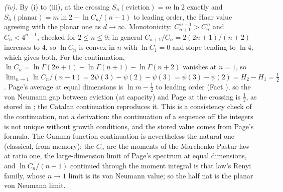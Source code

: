 \emph{(iv).} By (i) to (iii), at the crossing $S_{n}(\text{eviction}) = m\ln 2$ exactly and $S_{n}(\text{planar}) = m\ln 2 - \ln C_{n}/(n-1)$ to leading order, the Haar value agreeing with the planar one as $d \to \infty$. Monotonicity: $C_{n+1}^{\,n-1} > C_{n}^{\,n}$ and $C_{n} < 4^{n-1}$, checked for $2 \leq n \leq 9$; in general $C_{n+1}/C_{n} = 2(2n+1)/(n+2)$ increases to $4$, so $\ln C_n$ is convex in $n$ with $\ln C_{1} = 0$ and slope tending to $\ln 4$, which gives both. For the continuation, $\ln C_{n} = \ln\Gamma(2n+1) - \ln\Gamma(n+1) - \ln\Gamma(n+2)$ vanishes at $n = 1$, so $\lim_{n\to 1}\ln C_{n}/(n-1) = 2\psi(3) - \psi(2) - \psi(3) = \psi(3) - \psi(2) = H_{2} - H_{1} = \tfrac12$. Page's average at equal dimensions is $\ln m - \tfrac12$ to leading order (Fact ), so the von Neumann gap between eviction (at capacity) and Page at the crossing is $\tfrac12$, as stored in ; the Catalan continuation reproduces it. This is a consistency check of the continuation, not a derivation: the continuation of a sequence off the integers is not unique without growth conditions, and the stored value comes from Page's formula. The Gamma-function continuation is nevertheless the natural one (classical, from memory): the $C_{n}$ are the moments of the Marchenko-Pastur law at ratio one, the large-dimension limit of Page's spectrum at equal dimensions, and $\ln C_{n}/(n-1)$ continued through the moment integral is that law's Renyi family, whose $n \to 1$ limit is its von Neumann value; so the half nat is the planar von Neumann limit.
